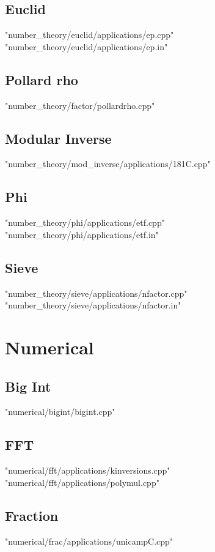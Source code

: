 \documentclass [12pt,onecolumn,oneside]{article}
\begin{document}
\subsection{ Euclid}
 {"number_theory/euclid/applications/ep.cpp"}
 {"number_theory/euclid/applications/ep.in"}
\subsection{ Pollard rho}
 {"number_theory/factor/pollardrho.cpp"}
\subsection{ Modular Inverse}
 {"number_theory/mod_inverse/applications/181C.cpp"}
\subsection{ Phi}
 {"number_theory/phi/applications/etf.cpp"}
 {"number_theory/phi/applications/etf.in"}
\subsection{ Sieve}
 {"number_theory/sieve/applications/nfactor.cpp"}
 {"number_theory/sieve/applications/nfactor.in"}
\newpage

\section{Numerical}
\subsection{ Big Int}
 {"numerical/bigint/bigint.cpp"}
\subsection{ FFT}
 {"numerical/fft/applications/kinversions.cpp"}
 {"numerical/fft/applications/polymul.cpp"}
\subsection{ Fraction}
 {"numerical/frac/applications/unicampC.cpp"}
\end{document}

